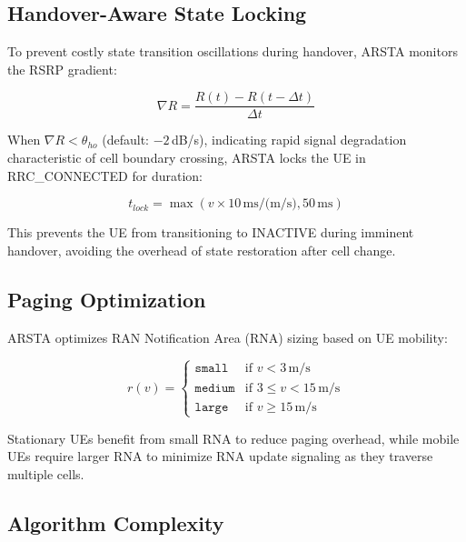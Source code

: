 \documentclass[conference]{IEEEtran}
\begin{document}
\subsection{Handover-Aware State Locking}
\label{subsec:ho_locking}

To prevent costly state transition oscillations during handover, ARSTA monitors the RSRP gradient:

\begin{equation}
    \nabla R = \frac{R(t) - R(t-\Delta t)}{\Delta t}
    \label{eq:rsrp_gradient}
\end{equation}

When $\nabla R < \theta_{ho}$ (default: $-2$\,dB/s), indicating rapid signal degradation characteristic of cell boundary crossing, ARSTA locks the UE in RRC\_CONNECTED for duration:

\begin{equation}
    t_{lock} = \max(v \times 10\,\text{ms/(m/s)}, 50\,\text{ms})
    \label{eq:lock_duration}
\end{equation}

This prevents the UE from transitioning to INACTIVE during imminent handover, avoiding the overhead of state restoration after cell change.

\subsection{Paging Optimization}
\label{subsec:paging}

ARSTA optimizes RAN Notification Area (RNA) sizing based on UE mobility:

\begin{equation}
    r(v) = \begin{cases}
        \texttt{small} & \text{if } v < 3\,\text{m/s} \\
        \texttt{medium} & \text{if } 3 \leq v < 15\,\text{m/s} \\
        \texttt{large} & \text{if } v \geq 15\,\text{m/s}
    \end{cases}
    \label{eq:rna_size}
\end{equation}

Stationary UEs benefit from small RNA to reduce paging overhead, while mobile UEs require larger RNA to minimize RNA update signaling as they traverse multiple cells.

\subsection{Algorithm Complexity}
\label{subsec:complexity}
\end{document}
